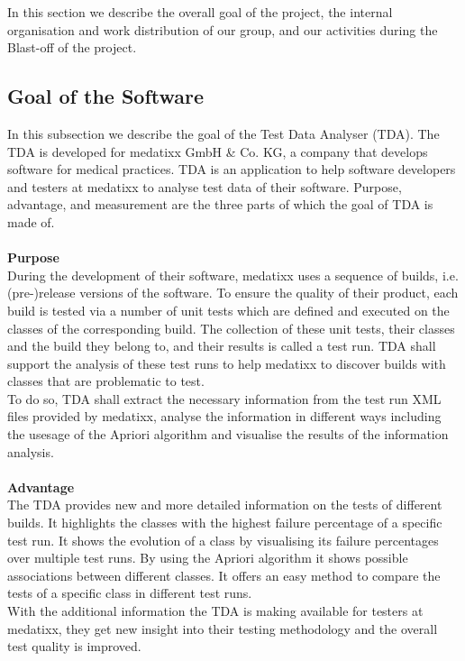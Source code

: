 
In this section we describe the overall goal of the project, the internal organisation and work distribution of our group, and our activities during the Blast-off of the project.  \\

\subsection{Goal of the Software}

In this subsection we describe the goal of the Test Data Analyser (TDA). The TDA is developed for medatixx GmbH \& Co. KG, a company that develops software for medical practices. TDA is an application to help software developers and testers at medatixx to analyse test data of their software. Purpose, advantage, and measurement are the three parts of which the goal of TDA is made of. \\
\ \\
{\large\textbf{Purpose}}\\ 
During the development of their software, medatixx uses a sequence of builds, i.e. (pre-)release versions of the software. To ensure the quality of their product, each build is tested via a number of unit tests which are defined and executed on the classes of the corresponding build. The collection of these unit tests, their classes and the build they belong to, and their results is called a test run. TDA shall support the analysis of these test runs to help medatixx to discover builds with classes that are problematic to test. \\ 
To do so, TDA shall extract the necessary information from the test run XML files provided by medatixx, analyse the information in different ways including the usesage of the Apriori algorithm and visualise the results of the information analysis. \\ 
\ \\

{\large\textbf{Advantage}}\\ 
The TDA provides new and more detailed information on the tests of different builds. It highlights the classes with the highest failure percentage of a specific test run. It shows the evolution of a class by visualising its failure percentages over multiple test runs. By using the Apriori algorithm it shows possible associations between different classes. It offers an easy method to compare the tests of a specific class in different test runs. \\ 
With the additional information the TDA is making available for testers at medatixx, they get new insight into their testing methodology and the overall test quality is improved. \\
\ \\

